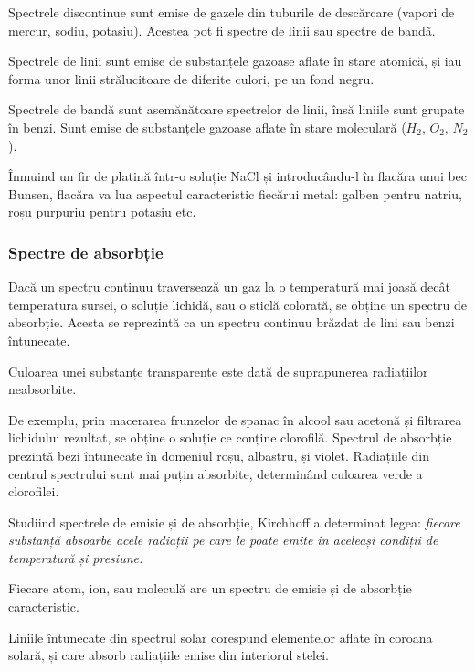 Spectrele discontinue sunt emise de gazele din tuburile de descărcare (vapori
de mercur, sodiu, potasiu). Acestea pot fi spectre de linii sau spectre de
bandã.

Spectrele de linii sunt emise de substanțele gazoase aflate în stare atomică,
și iau forma unor linii strălucitoare de diferite culori, pe un fond negru.

Spectrele de bandă sunt asemănătoare spectrelor de linii, însă liniile sunt
grupate în benzi. Sunt emise de substanțele gazoase aflate în stare moleculară
($H_2$, $O_2$, $N_2$).

Înmuind un fir de platină într-o soluție NaCl și introducându-l în flacăra unui
bec Bunsen, flacăra va lua aspectul caracteristic fiecărui metal: galben pentru
natriu, roșu purpuriu pentru potasiu etc.

\subsubsection{Spectre de absorbție}

Dacă un spectru continuu traversează un gaz la o temperatură mai joasă decât
temperatura sursei, o soluție lichidă, sau o sticlă colorată, se obține un
spectru de absorbție. Acesta se reprezintă ca un spectru continuu brăzdat de
lini sau benzi întunecate.

Culoarea unei substanțe transparente este dată de suprapunerea radiațiilor
neabsorbite.

De exemplu, prin macerarea frunzelor de spanac în alcool sau acetonă și
filtrarea lichidului rezultat, se obține o soluție ce conține clorofilă.
Spectrul de absorbție prezintă bezi întunecate în domeniul roșu, albastru, și
violet. Radiațiile din centrul spectrului sunt mai puțin absorbite, determinând
culoarea verde a clorofilei.

Studiind spectrele de emisie și de absorbție, Kirchhoff a determinat legea:
\emph{fiecare substanță absoarbe acele radiații pe care le poate emite în
aceleași condiții de temperatură și presiune.}

Fiecare atom, ion, sau moleculă are un spectru de emisie și de absorbție
caracteristic.

Liniile întunecate din spectrul solar corespund elementelor aflate în coroana
solară, și care absorb radiațiile emise din interiorul stelei.

\clearpage

